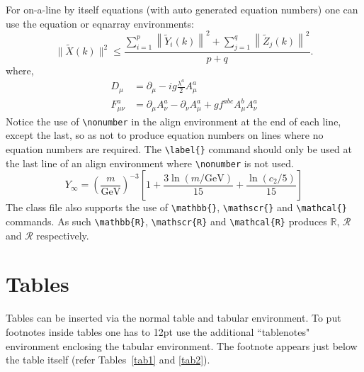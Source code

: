 \documentclass[unnumsec,webpdf,contemporary,large]{oup-authoring-template}%
\theoremstyle{thmstyleone}%
\theoremstyle{thmstyletwo}%
\theoremstyle{thmstylethree}%
\begin{document}
For on-a-line by itself equations (with auto generated equation numbers)
one can use the equation or eqnarray environments:
\begin{equation}
\|\tilde{X}(k)\|^2 \leq\frac{\sum\limits_{i=1}^{p}\left\|\tilde{Y}_i(k)\right\|^2+\sum\limits_{j=1}^{q}\left\|\tilde{Z}_j(k)\right\|^2 }{p+q}.\label{eq1}
\end{equation}
where,
\begin{align}
D_\mu &=  \partial_\mu - ig \frac{\lambda^a}{2} A^a_\mu \nonumber \\
F^a_{\mu\nu} &= \partial_\mu A^a_\nu - \partial_\nu A^a_\mu + g f^{abc} A^b_\mu A^a_\nu\label{eq2}
\end{align}
Notice the use of \verb+\nonumber+ in the align environment at the end
of each line, except the last, so as not to produce equation numbers on
lines where no equation numbers are required. The \verb+\label{}+ command
should only be used at the last line of an align environment where
\verb+\nonumber+ is not used.
\begin{equation}
Y_\infty = \left( \frac{m}{\textrm{GeV}} \right)^{-3}
    \left[ 1 + \frac{3 \ln(m/\textrm{GeV})}{15}
    + \frac{\ln(c_2/5)}{15} \right]
\end{equation}
The class file also supports the use of \verb+\mathbb{}+, \verb+\mathscr{}+ and
\verb+\mathcal{}+ commands. As such \verb+\mathbb{R}+, \verb+\mathscr{R}+
and \verb+\mathcal{R}+ produces $\mathbb{R}$, $\mathscr{R}$ and $\mathcal{R}$
respectively.



\section{Tables}\label{sec5}

Tables can be inserted via the normal table and tabular environment. To put
footnotes inside tables one has to 12pt use the additional ``tablenotes" environment
enclosing the tabular environment. The footnote appears just below the table
itself (refer Tables~\ref{tab1} and \ref{tab2}).
\end{document}
